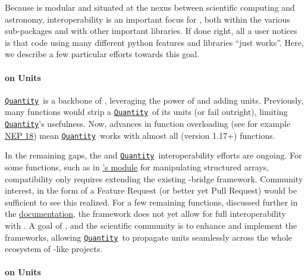\documentclass[modern]{aastex631}
\newcommand{\astropyapi}[2]{\href{https://docs.astropy.org/en/stable/api/astropy.#1.html}{#2}}
\newcommand{\astropyapidoc}[2]{\astropyapi{#1}{\texttt{#2}\xspace}}
\newcommand{\astropyQuantity}{\astropyapidoc{units.Quantity}{Quantity}}
\begin{document}
  Because \astropy is modular and situated at the nexus between scientific
  computing and astronomy, interoperability is an important focus for \astropy,
  both within the various \astropypkg sub-packages and with other important
  \python libraries. If done right, all a user notices is that code using many
  different python features and libraries ``just works''. Here, we describe a
  few particular efforts towards this goal.

  \paragraph{ on Units}

    \astropyQuantity\ is a backbone of \astropy, leveraging the power of
     and adding units. Previously, many  functions
    would strip a \astropyQuantity\ of its units (or fail outright), limiting
    \astropyQuantity's usefulness. Now, advances in  function
    overloading (see for example
    \href{https://numpy.org/neps/nep-0018-array-function-protocol.html}{NEP 18})
    mean \astropyQuantity\ works with almost all  (version 1.17+)
    functions.

    In the remaining gaps, the  and \astropyQuantity\
    interoperability efforts are ongoing. For some functions, such as in
    \href{https://numpy.org/doc/stable/user/basics.rec.html#module-numpy.lib.recfunctions}{'s
    module} for manipulating structured arrays, compatibility only requires
    extending the existing \package{numpy}-\astropypkg bridge framework.
    Community interest, in the form of a Feature Request (or better yet Pull
    Request) would be sufficient to see this realized. For a few remaining
    functions, discussed further in the
    \href{https://docs.astropy.org/en/stable/known_issues.html#known-deficiencies}{\astropy
    documentation}, the \package{numpy} framework does not yet allow for full
    interoperability with \astropy. A goal of \astropy, and the scientific
    \python community is to enhance and implement the frameworks, allowing
    \astropyQuantity\ to propagate units seamlessly across the whole ecosystem
    of \package{numpy}-like projects.

  \paragraph{\astropypkg on Units}
\end{document}
